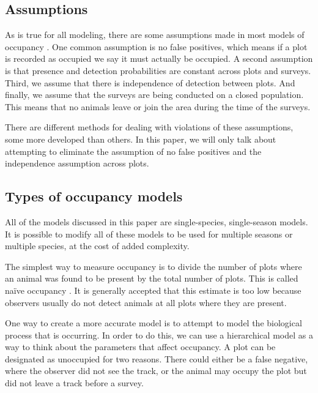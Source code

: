 \documentclass[12pt]{article}
\begin{document}
    \subsection{Assumptions}
    As is true for all modeling, there are some assumptions made in most models
    of occupancy \cite{MacKenzie2006}. One common
    assumption is no false positives, which means if a
    plot is recorded as occupied we say it must actually be occupied. A second
    assumption is that presence and detection probabilities are constant
    across plots and surveys.
    Third, we assume that there is independence of detection between
    plots. And finally, we assume that the surveys are being conducted on
    a closed population. This means that no animals leave or join the
    area during the time of the surveys.

    There are different methods for dealing with violations of these
    assumptions, some more developed than others.  In this paper, we will only
    talk about attempting to eliminate the
    assumption of no false positives and the independence assumption
    across plots.

    \subsection{Types of occupancy models}
    All of the models discussed in this paper are single-species, single-season
    models. It is possible to modify all of these models to be used for multiple
    seasons or multiple species, at the cost of added complexity.

    The simplest way to measure occupancy is to divide the number of
    plots where an animal was found to be present by the total number of plots.
    This is called na\"ive occupancy \cite{MacKenzie2006}. It is generally
    accepted that this estimate is too low because observers usually do not
    detect animals at
    all plots where they are present.

    One way to create a more accurate model is to attempt to model the
    biological process that is occurring.  In order to do this, we can use a
    hierarchical model as a
    way to think about the parameters that affect occupancy. A plot can be
    designated as unoccupied for two reasons.
    There could either be
    a false negative, where the observer did not see the track,
    or
    the animal may occupy the plot but did not leave a track before a survey.
\end{document}
